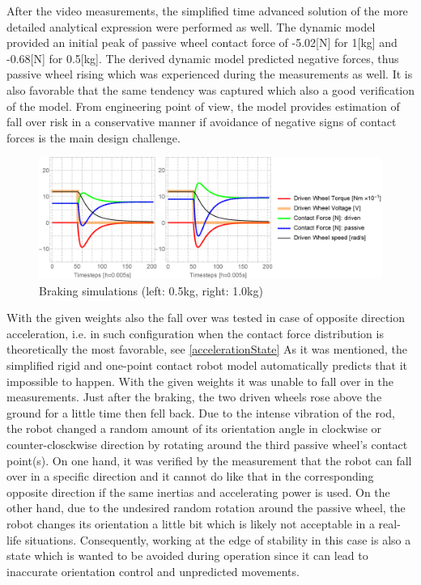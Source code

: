 \documentclass[12pt,english,twoside]{article}
\begin{document}
After the video measurements, the simplified time advanced solution of the more detailed analytical expression were performed as well. The dynamic model provided an initial peak of passive wheel contact force of -5.02[N] for 1[kg] and -0.68[N] for 0.5[kg]. The derived dynamic model predicted negative forces, thus passive wheel rising which was experienced during the measurements as well. It is also favorable that the same tendency was captured which also a good verification of the model. From engineering point of view, the model provides estimation of fall over risk in a conservative manner if avoidance of negative signs of contact forces is the main design challenge.

\begin{figure}[htb!]
	\centering
	\includegraphics[width=\textwidth]{figures/simulation_0_5_1_0}
	\caption{Braking simulations (left: 0.5kg, right: 1.0kg)}
	\label{simulation_0_5_1_0}
\end{figure}

With the given weights also the fall over was tested in case of opposite direction acceleration, i.e. in such configuration when the contact force distribution is theoretically the most favorable, see \ref{accelerationState} As it was mentioned, the simplified rigid and one-point contact robot model automatically predicts that it impossible to happen. With the given weights it was unable to fall over in the measurements. Just after the braking, the two driven wheels rose above the ground for a little time then fell back. Due to the intense vibration of the rod, the robot changed a random amount of its orientation angle in clockwise or counter-closckwise direction by rotating around the third passive wheel's contact point(s). On one hand, it was verified by the measurement that the robot can fall over in a specific direction and it cannot do like that in the corresponding opposite direction if the same inertias and accelerating power is used. On the other hand, due to the undesired random rotation around the passive wheel, the robot changes its orientation a little bit which is likely not acceptable in a real-life situations. Consequently, working at the edge of stability in this case is also a state which is wanted to be avoided during operation since it can lead to inaccurate orientation control and unpredicted movements. 
\end{document}

